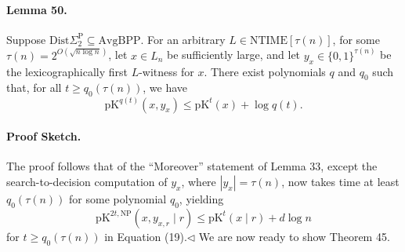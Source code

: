 \documentclass[10pt,a4paper]{article}
\begin{document}
\paragraph{Lemma 50.} Suppose $\mathrm{Dist}\Sigma_2^{\mathrm P}\subseteq\mathrm{AvgBPP}$. For an arbitrary $L\in\mathrm{NTIME}[\tau(n)]$, for some $\tau(n)=2^{O(\sqrt{n\log n})}$, let $x\in L_n$ be sufficiently large, and let $y_x\in\{0,1\}^{\tau(n)}$ be the lexicographically first $L$-witness for $x$. There exist polynomials $q$ and $q_0$ such that, for all $t\geq q_0(\tau(n))$, we have
\[\mathrm{pK}^{q(t)}(x,y_x)\leq\mathrm{pK}^t(x)+\log q(t).\]
\paragraph{Proof Sketch.} The proof follows that of the ``Moreover'' statement of Lemma 33, except the search-to-decision computation of $y_x$, where $|y_x|=\tau(n)$, now takes time at least $q_0(\tau(n))$ for some polynomial $q_0$, yielding
\[\mathrm{pK}^{2t,\mathrm{NP}}(x,y_{x,r}\mid r)\leq\mathrm{pK}^t(x\mid r)+d\log n\]
for $t\geq q_0(\tau(n))$ in Equation (19).\hfill$\triangleleft$
We are now ready to show Theorem 45.
\end{document}
